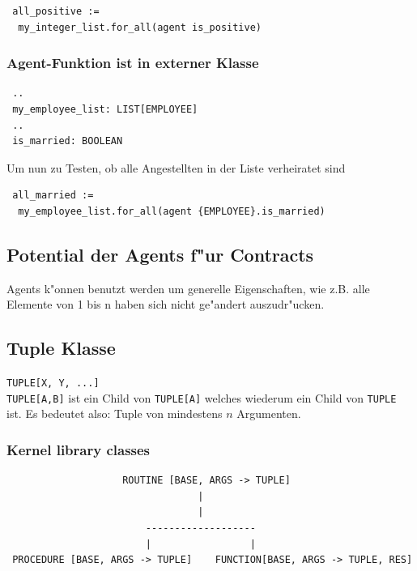 \documentclass[german, 10pt, a4paper, twocolumn]{scrartcl}
\theoremstyle{definition}
\begin{document}
\begin{verbatim}
 all_positive :=
  my_integer_list.for_all(agent is_positive)
\end{verbatim}

\subsubsection{Agent-Funktion ist in externer Klasse}

\begin{verbatim}
 ..
 my_employee_list: LIST[EMPLOYEE]
 ..
 is_married: BOOLEAN
\end{verbatim}

Um nun zu Testen, ob alle Angestellten in der Liste verheiratet sind

\small
\begin{verbatim}
 all_married :=
  my_employee_list.for_all(agent {EMPLOYEE}.is_married)
\end{verbatim}
\normalsize

\subsection{Potential der Agents f"ur Contracts}

Agents k"onnen benutzt werden um generelle Eigenschaften, wie z.B. alle Elemente von 1 bis n haben sich nicht ge"andert auszudr"ucken.

\subsection{Tuple Klasse}

\verb#TUPLE[X, Y, ...]#\\

\verb#TUPLE[A,B]# ist ein Child von \verb#TUPLE[A]# welches wiederum ein Child von \verb#TUPLE# ist. Es bedeutet also: Tuple von mindestens $n$ Argumenten.

\subsubsection{Kernel library classes}

\scriptsize
\begin{verbatim}
                    ROUTINE [BASE, ARGS -> TUPLE]
                                 |
                                 |
                        -------------------
                        |                 |
 PROCEDURE [BASE, ARGS -> TUPLE]    FUNCTION[BASE, ARGS -> TUPLE, RES]
\end{verbatim}
\normalsize
\end{document}
